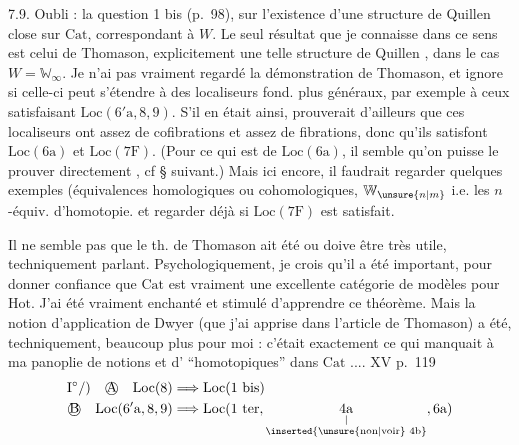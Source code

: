7.9. Oubli : la question 1 bis (p.~98),
sur l'existence d'une structure de Quillen
close sur $\mathrm{Cat}$, correspondant à $W$. Le
seul résultat que je connaisse dans
ce sens est celui de Thomason,
  explicitement une telle
structure de Quillen , dans le cas $W=\mathbb{W}_{\infty}$.
Je n'ai pas vraiment regardé la démonstration
de Thomason, et ignore si celle-ci
peut s'étendre à des localiseurs fond. plus
généraux, par exemple à ceux satisfaisant
$\mathrm{Loc}(6'\mathrm{a},8,9)$. S'il en était ainsi, 
prouverait d'ailleurs que ces localiseurs
ont assez de cofibrations et assez de fibrations,
donc qu'ils satisfont $\mathrm{Loc}(6\mathrm{a})$ et $\mathrm{Loc}(7\mathrm{F})$.
(Pour ce qui est de $\mathrm{Loc}(6\mathrm{a})$, il semble qu'on
puisse le prouver directement , cf \S{} suivant.)
Mais ici encore, il faudrait regarder quelques
exemples (équivalences homologiques ou cohomologiques,
$\mathbb{W}_{\unsure{n|m}}$ i.e. les $n$-équiv. d'homotopie.
et regarder déjà si $\mathrm{Loc}(7\mathrm{F})$ est satisfait.

Il ne  semble pas que le th. de
Thomason ait été  ou doive être très utile,
 techniquement parlant. Psychologiquement,
je crois qu'il a été important,
pour donner confiance que $\mathrm{Cat}$ est vraiment
une excellente catégorie de modèles
pour $\mathrm{Hot}$. J'ai été vraiment enchanté et
stimulé d'apprendre ce théorème. Mais
la notion d'application de Dwyer (que j'ai
apprise  dans l'article de Thomason) a
été, techniquement, beaucoup plus 
pour moi : c'était exactement ce qui
manquait à ma panoplie de notions et d'
``homotopiques'' dans $\mathrm{Cat}$ ....
XV p.~119
\[
\begin{aligned}
\mathrm{I}^{\circ}/)\quad\text{\textcircled{A}}\quad\mathrm{Loc}(8)&\Longrightarrow\mathrm{Loc}(1\ \mathrm{bis})\\
\text{\textcircled{B}}\quad\mathrm{Loc}(6'\mathrm{a},8,9)&\Longrightarrow
\mathrm{Loc}(1\ \mathrm{ter},\underset{\substack{\vert\\\inserted{\text{\unsure{non|voir} }4\mathrm{b}}}}{4\mathrm{a}},6\mathrm{a})
\end{aligned}
\]


